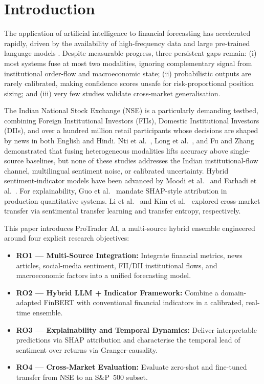 \documentclass[12pt,a4paper]{article}
\begin{document}
\section{Introduction}

The application of artificial intelligence to financial forecasting has
accelerated rapidly, driven by the availability of high-frequency data and
large pre-trained language models \cite{r1,r8}. Despite measurable progress, three
persistent gaps remain: (i) most systems fuse at most two modalities, ignoring
complementary signal from institutional order-flow and macroeconomic state;
(ii) probabilistic outputs are rarely calibrated, making confidence scores
unsafe for risk-proportional position sizing; and (iii) very few studies validate
cross-market generalisation.

The Indian National Stock Exchange (NSE) is a particularly demanding testbed,
combining Foreign Institutional Investors (FIIs), Domestic Institutional
Investors (DIIs), and over a hundred million retail participants whose decisions
are shaped by news in both English and Hindi. Nti et al.\ \cite{r2}, Long
et al.\ \cite{r3}, and Fu and Zhang \cite{r4} demonstrated that fusing heterogeneous modalities lifts
accuracy above single-source baselines, but none of these studies addresses the Indian
institutional-flow channel, multilingual sentiment noise, or calibrated
uncertainty. Hybrid sentiment-indicator models have been advanced by Moodi et al.\
\cite{r5} and Farhadi et al.\ \cite{r6}. For explainability, Guo et al.\
\cite{r9} mandate SHAP-style attribution in production quantitative systems.
Li et al.\ \cite{r10} and Kim et al.\ \cite{r11} explored cross-market transfer
via sentimental transfer learning and transfer entropy, respectively.

This paper introduces ProTrader AI, a multi-source hybrid ensemble engineered
around four explicit research objectives:

\begin{itemize}
  \item \textbf{RO1 --- Multi-Source Integration:} Integrate financial metrics,
        news articles, social-media sentiment, FII/DII institutional flows, and
        macroeconomic factors into a unified forecasting model.
  \item \textbf{RO2 --- Hybrid LLM + Indicator Framework:} Combine a domain-adapted
        FinBERT with conventional financial indicators in a calibrated, real-time
        ensemble.
  \item \textbf{RO3 --- Explainability and Temporal Dynamics:} Deliver interpretable
        predictions via SHAP attribution and characterise the temporal lead of
        sentiment over returns via Granger-causality.
  \item \textbf{RO4 --- Cross-Market Evaluation:} Evaluate zero-shot and fine-tuned
        transfer from NSE to an S\&P~500 subset.
\end{itemize}
\end{document}
